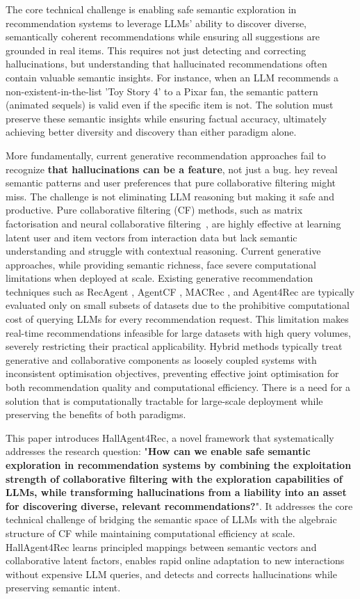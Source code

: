 \documentclass[acmsmall]{acmart}
\begin{document}
The core technical challenge is enabling safe semantic exploration in recommendation systems to leverage LLMs' ability to discover diverse, semantically coherent recommendations while ensuring all suggestions are grounded in real items. This requires not just detecting and correcting hallucinations, but understanding that hallucinated recommendations often contain valuable semantic insights. For instance, when an LLM recommends a non-existent-in-the-list 'Toy Story 4' to a Pixar fan, the semantic pattern (animated sequels) is valid even if the specific item is not. The solution must preserve these semantic insights while ensuring factual accuracy, ultimately achieving better diversity and discovery than either paradigm alone.

More fundamentally, current generative recommendation approaches fail to recognize \textbf{that hallucinations can be a feature}, not just a bug. hey reveal semantic patterns and user preferences that pure collaborative filtering might miss. The challenge is not eliminating LLM reasoning but making it safe and productive. Pure collaborative filtering (CF) methods, such as matrix factorisation \cite{koren2009matrix} and neural collaborative filtering~\cite{he2017neural}, are highly effective at learning latent user and item vectors from interaction data but lack semantic understanding and struggle with contextual reasoning. Current generative approaches, while providing semantic richness, face severe computational limitations when deployed at scale. Existing generative recommendation techniques such as RecAgent \cite{wang2025user}, AgentCF \cite{zhang2024agentcf}, MACRec \cite{wang2024macrec}, and Agent4Rec \cite{zhang2024generative} are typically evaluated only on small subsets of datasets due to the prohibitive computational cost of querying LLMs for every recommendation request. This limitation makes real-time recommendations infeasible for large datasets with high query volumes, severely restricting their practical applicability. Hybrid methods \cite{sun2021bert4rec, wu2024llm} typically treat generative and collaborative components as loosely coupled systems with inconsistent optimisation objectives, preventing effective joint optimisation for both recommendation quality and computational efficiency. There is a need for a solution that is computationally tractable for large-scale deployment while preserving the benefits of both paradigms.

This paper introduces HallAgent4Rec, a novel framework that systematically addresses the research question: "\textbf{How can we enable safe semantic exploration in recommendation systems by combining the exploitation strength of collaborative filtering with the exploration capabilities of LLMs, while transforming hallucinations from a liability into an asset for discovering diverse, relevant recommendations?}". It addresses the core technical challenge of bridging the semantic space of LLMs with the algebraic structure of CF while maintaining computational efficiency at scale. HallAgent4Rec learns principled mappings between semantic vectors and collaborative latent factors, enables rapid online adaptation to new interactions without expensive LLM queries, and detects and corrects hallucinations while preserving semantic intent. 
\end{document}
